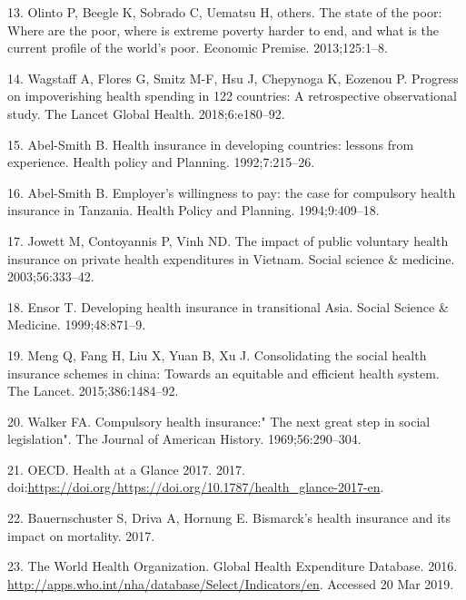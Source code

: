 \documentclass[]{elsarticle} %
\begin{document}
\leavevmode\hypertarget{ref-olinto2013state}{}%
13. Olinto P, Beegle K, Sobrado C, Uematsu H, others. The state of the poor: Where are the poor, where is extreme poverty harder to end, and what is the current profile of the world's poor. Economic Premise. 2013;125:1--8.

\leavevmode\hypertarget{ref-wagstaff2018progress}{}%
14. Wagstaff A, Flores G, Smitz M-F, Hsu J, Chepynoga K, Eozenou P. Progress on impoverishing health spending in 122 countries: A retrospective observational study. The Lancet Global Health. 2018;6:e180--92.

\leavevmode\hypertarget{ref-abel1992health}{}%
15. Abel-Smith B. Health insurance in developing countries: lessons from experience. Health policy and Planning. 1992;7:215--26.

\leavevmode\hypertarget{ref-abel1994employer}{}%
16. Abel-Smith B. Employer's willingness to pay: the case for compulsory health insurance in Tanzania. Health Policy and Planning. 1994;9:409--18.

\leavevmode\hypertarget{ref-jowett2003impact}{}%
17. Jowett M, Contoyannis P, Vinh ND. The impact of public voluntary health insurance on private health expenditures in Vietnam. Social science \& medicine. 2003;56:333--42.

\leavevmode\hypertarget{ref-ensor1999developing}{}%
18. Ensor T. Developing health insurance in transitional Asia. Social Science \& Medicine. 1999;48:871--9.

\leavevmode\hypertarget{ref-meng2015consolidating}{}%
19. Meng Q, Fang H, Liu X, Yuan B, Xu J. Consolidating the social health insurance schemes in china: Towards an equitable and efficient health system. The Lancet. 2015;386:1484--92.

\leavevmode\hypertarget{ref-walker1969compulsory}{}%
20. Walker FA. Compulsory health insurance:" The next great step in social legislation". The Journal of American History. 1969;56:290--304.

\leavevmode\hypertarget{ref-healthglance2017}{}%
21. OECD. Health at a Glance 2017. 2017. doi:\href{https://doi.org/https://doi.org/https://doi.org/10.1787/health_glance-2017-en}{https://doi.org/https://doi.org/10.1787/health\_glance-2017-en}.

\leavevmode\hypertarget{ref-bauernschuster2017bismarck}{}%
22. Bauernschuster S, Driva A, Hornung E. Bismarck's health insurance and its impact on mortality. 2017.

\leavevmode\hypertarget{ref-WHOdata}{}%
23. The World Health Organization. Global Health Expenditure Database. 2016. \url{http://apps.who.int/nha/database/Select/Indicators/en}. Accessed 20 Mar 2019.
\end{document}
